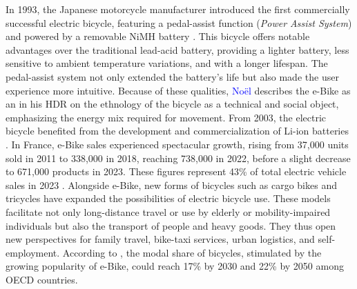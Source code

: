\begin{refsegment}
In 1993, the Japanese motorcycle manufacturer  introduced the first commercially successful electric bicycle, featuring a pedal-assist function (\textsl{Power Assist System}) and powered by a removable \acrshort{NiMH} battery \textcolor{blue}{\autocite[430]{bertoluzzo_development_2011}}. This bicycle offers notable advantages over the traditional lead-acid battery, providing a lighter battery, less sensitive to ambient temperature variations, and with a longer lifespan. The pedal-assist system not only extended the battery's life but also made the user experience more intuitive. Because of these qualities, \textcolor{blue}{Noël} \textcolor{blue}{\textcite[25]{jouenne_quest-ce_2022}} describes the \acrshort{e-Bike} as an  in his \acrfull{HDR} on the ethnology of the bicycle as a technical and social object, emphasizing the energy mix required for movement. From 2003, the electric bicycle benefited from the development and commercialization of \acrshort{Li-ion} batteries \textcolor{blue}{\autocite[6]{hung_review_2020}}. In France, \acrshort{e-Bike} sales experienced spectacular growth, rising from 37,000 units sold in 2011 to 338,000 in 2018, reaching 738,000 in 2022, before a slight decrease to 671,000 products in 2023. These figures represent 43\% of total electric vehicle sales in 2023 \textcolor{blue}{\autocite{union_sport__cycle_chiffres_2024}}. Alongside \acrshort{e-Bike}, new forms of bicycles such as cargo bikes and tricycles have expanded the possibilities of electric bicycle use. These models facilitate not only long-distance travel or use by elderly or mobility-impaired individuals but also the transport of people and heavy goods. They thus open new perspectives for family travel, bike-taxi services, urban logistics, and self-employment. According to \textcolor{blue}{\textcite[24]{mason_global_2015}}, the modal share of bicycles, stimulated by the growing popularity of \acrshort{e-Bike}, could reach 17\% by 2030 and 22\% by 2050 among OECD countries.%


\end{refsegment}
